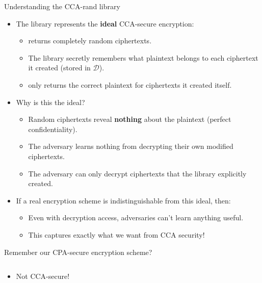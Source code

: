 \documentclass[aspectratio=169, lualatex, handout]{beamer}
\begin{document}
\begin{frame}{Understanding the CCA-rand library}
	\begin{itemize}
		\item The  library represents the \textbf{ideal} CCA-secure encryption:
		      \begin{itemize}
			      \item {} returns completely random ciphertexts.
			      \item The library secretly remembers what plaintext belongs to each ciphertext it created (stored in $\mathcal{D}$).
			      \item {} only returns the correct plaintext for ciphertexts it created itself.
		      \end{itemize}
		\item Why is this the ideal?
		      \begin{itemize}
			      \item Random ciphertexts reveal \textbf{nothing} about the plaintext (perfect confidentiality).
			      \item The adversary learns nothing from decrypting their own modified ciphertexts.
			      \item The adversary can only decrypt ciphertexts that the library explicitly created.
		      \end{itemize}
		\item If a real encryption scheme is indistinguishable from this ideal, then:
		      \begin{itemize}
			      \item Even with decryption access, adversaries can't learn anything useful.
			      \item This captures exactly what we want from CCA security!
		      \end{itemize}
	\end{itemize}
\end{frame}

\begin{frame}{Remember our CPA-secure encryption scheme?}
	\begin{columns}[c]
		\begin{column}{0.5\textwidth}
			\begin{itemize}
				\item Not CCA-secure!
			\end{itemize}
		\end{column}
		\begin{column}{0.5\textwidth}
		\end{column}
	\end{columns}
\end{frame}
\end{document}
